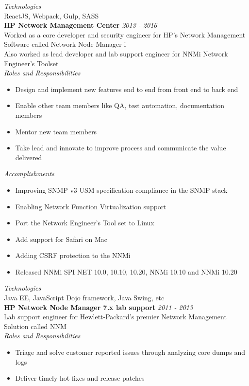 \documentclass[line,margin]{res}
\begin{document}
\begin{resume}
{\it{Technologies}}\\
ReactJS, Webpack, Gulp, SASS\\


{\bf HP Network Management Center} \hfill {\it{2013 - 2016}}\\
Worked as a core developer and security engineer for HP's Network Management Software called Network Node Manager i\\
Also worked as lead developer and lab support engineer for NNMi Network Engineer's Toolset\\

{\it{Roles and Responsibilities}}\\
\begin{itemize}
\item Design and implement new features end to end from front end to back end
\item Enable other team members like QA, test automation, documentation members
\item Mentor new team members
\item Take lead and innovate to improve process and communicate the value delivered
\end{itemize}

{\it{Accomplishments}}\\
\begin{itemize}
\item Improving SNMP v3 USM specification compliance in the SNMP stack
\item Enabling Network Function Virtualization support
\item Port the Network Engineer's Tool set to Linux
\item Add support for Safari on Mac
\item Adding CSRF protection to the NNMi
\item Released NNMi SPI NET 10.0, 10.10, 10.20, NNMi 10.10 and NNMi 10.20
\end{itemize}

{\it{Technologies}}\\
Java EE, JavaScript Dojo framework, Java Swing, etc\\

{\bf HP Network Node Manager 7.x lab support} \hfill {\it{2011 - 2013}}\\
Lab support engineer for Hewlett-Packard's premier Network Management Solution called NNM\\

{\it{Roles and Responsibilities}}\\
\begin{itemize}
\item Triage and solve customer reported issues through analyzing core dumps and logs
\item Deliver timely hot fixes and release patches
\end{itemize}


\end{resume}
\end{document}
